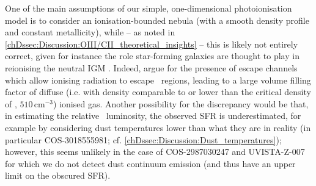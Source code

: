 One of the main assumptions of our simple, one-dimensional photoionisation model is to consider an ionisation-bounded nebula (with a smooth density profile and constant metallicity), while -- as noted in \cref{chDssec:Discussion:OIII/CII_theoretical_insights} -- this is likely not entirely correct, given for instance the role star-forming galaxies are thought to play in reionising the neutral IGM \citep{2021arXiv211013160R}. Indeed, \citet{2015A&A...578A..53C, 2019A&A...626A..23C} argue for the presence of escape channels which allow ionising radiation to escape \HII\ regions, leading to a large volume filling factor of diffuse (i.e. with density comparable to or lower than the critical density of \OIIILam, $510 \, \mathrm{cm^{-3}}$) ionised gas. Another possibility for the discrepancy would be that, in estimating the relative \OIIIf\ luminosity, the observed SFR is underestimated, for example by considering dust temperatures lower than what they are in reality (in particular COS-3018555981; cf. \cref{chDssec:Discussion:Dust_temperatures}); however, this seems unlikely in the case of COS-2987030247 and UVISTA-Z-007 for which we do not detect dust continuum emission (and thus have an upper limit on the obscured SFR).

